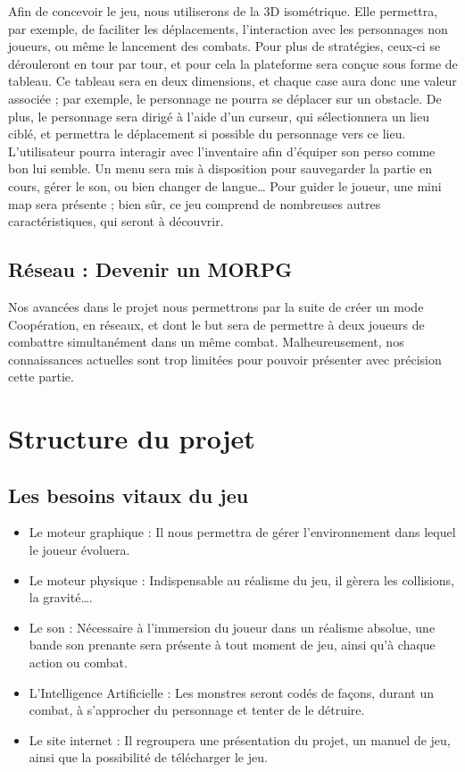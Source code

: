 \documentclass[12pt]{article}
\begin{document}
Afin de concevoir le jeu, nous utiliserons de la 3D isométrique. Elle permettra, par exemple, de faciliter les déplacements, l’interaction avec les personnages non joueurs, ou même le lancement des combats. Pour plus de stratégies, ceux-ci se dérouleront en tour par tour, et pour cela la plateforme sera conçue sous forme de tableau. Ce tableau sera en deux dimensions, et chaque case aura donc une valeur associée ; par exemple, le personnage ne pourra se déplacer sur un obstacle. De plus, le personnage sera dirigé à l’aide d’un curseur, qui sélectionnera un lieu ciblé, et permettra le déplacement si possible du personnage vers ce lieu. L’utilisateur pourra interagir avec l’inventaire afin d’équiper son perso comme bon lui semble. Un menu sera mis à disposition pour sauvegarder la partie en cours, gérer le son, ou bien changer de langue… Pour guider le joueur, une mini map sera présente ; bien sûr, ce jeu comprend de nombreuses autres caractéristiques, qui seront à découvrir.

\subsection{Réseau : Devenir un MORPG}

Nos avancées dans le projet nous permettrons par la suite de créer un mode Coopération, en réseaux, et dont le but sera de permettre à deux joueurs de combattre simultanément dans un même combat. Malheureusement, nos connaissances actuelles sont trop limitées pour pouvoir présenter avec précision cette partie.

\newpage
\section{Structure du projet}

\subsection{Les besoins vitaux du jeu}

\begin{itemize}
\item Le moteur graphique : Il nous permettra de gérer l’environnement dans lequel le joueur évoluera.
\item Le moteur physique : Indispensable au réalisme du jeu, il gèrera les collisions, la gravité…. 
\item Le son : Nécessaire à l’immersion du joueur dans un réalisme absolue, une bande son prenante sera présente à tout moment de jeu, ainsi qu’à chaque action ou combat.
\item L’Intelligence Artificielle : Les monstres seront codés de façons, durant un combat, à s’approcher du personnage et tenter de le détruire.
\item Le site internet : Il regroupera une présentation du projet, un manuel de jeu, ainsi que la possibilité de télécharger le jeu.
\end{itemize}
\end{document}
